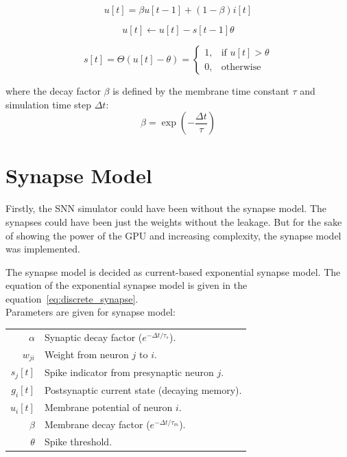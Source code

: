\documentclass[11pt,a4paper]{article}
\begin{document}
\begin{equation}
u[t] = \beta u[t-1] + (1 - \beta) i[t]
\label{eq:lif_integration}
\end{equation}

\begin{equation}
u[t] \leftarrow u[t] - s[t-1]\theta
\label{eq:lif_reset}
\end{equation}

\begin{equation}
s[t] = \Theta(u[t] - \theta) = 
\begin{cases} 
1, & \text{if } u[t] > \theta \\
0, & \text{otherwise}
\end{cases}
\label{eq:lif_spike}
\end{equation}

where the decay factor $\beta$ is defined by the membrane time constant $\tau$ and simulation time step $\Delta t$:
\begin{equation}
\beta = \exp\left(-\frac{\Delta t}{\tau}\right)
\end{equation}



\section{Synapse Model}
Firstly, the SNN simulator could have been without the synapse model. The synapses could have been just the weights without the leakage. 
But for the sake of showing the power of the GPU and increasing complexity, the synapse model was implemented.

The synapse model is decided as current-based exponential synapse model.
The equation of the exponential synapse model is given in the equation~\ref{eq:discrete_synapse}.\\

Parameters are given for synapse model: \\[0.5em]
\begin{tabular}{r l}
  $\alpha$ & Synaptic decay factor ($e^{-\Delta t / \tau_s}$). \\[0.5em]
  $w_{ji}$ & Weight from neuron $j$ to $i$. \\[0.5em]
  $s_j[t]$ & Spike indicator from presynaptic neuron $j$. \\[0.5em]
  $g_i[t]$ & Postsynaptic current state (decaying memory). \\[0.5em]
  $u_i[t]$ & Membrane potential of neuron $i$. \\[0.5em]
  $\beta$ & Membrane decay factor ($e^{-\Delta t / \tau_m}$). \\[0.5em]
  $\theta$ & Spike threshold.
\end{tabular}
\end{document}
